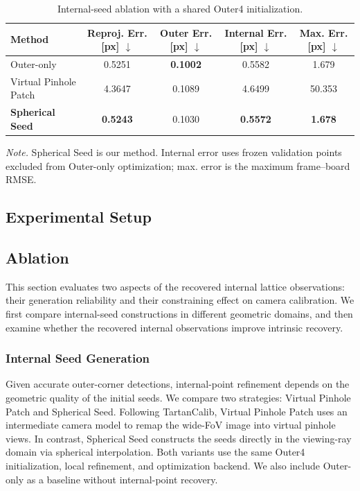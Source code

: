 \documentclass[letterpaper, 10 pt, conference]{ieeeconf}  %
\begin{document}
\begin{table}[t]
\centering
\caption{Internal-seed ablation with a shared Outer4 initialization.}
\label{tab:internal_seed_ablation}
\footnotesize
\setlength{\tabcolsep}{1.5pt}
\renewcommand{\arraystretch}{1.05}
\begin{tabular}{@{}lcccc@{}}
\toprule
Method
& \shortstack{Reproj.\\[-1pt]Err. [px] $\downarrow$}
& \shortstack{Outer\\[-1pt]Err. [px] $\downarrow$}
& \shortstack{Internal\\[-1pt]Err. [px] $\downarrow$}
& \shortstack{Max.\\[-1pt]Err. [px] $\downarrow$} \\
\midrule
Outer-only & 0.5251 & \textbf{0.1002} & 0.5582 & 1.679 \\
Virtual Pinhole Patch & 4.3647 & 0.1089 & 4.6499 & 50.353 \\
\textbf{Spherical Seed} & \textbf{0.5243} & 0.1030 & \textbf{0.5572} & \textbf{1.678} \\
\bottomrule
\end{tabular}
\vspace{2pt}
\parbox{\columnwidth}{\scriptsize \textit{Note.} Spherical Seed is our method. Internal error uses frozen validation points excluded from Outer-only optimization; max. error is the maximum frame--board RMSE.}
\end{table}

\subsection{Experimental Setup}


\subsection{Ablation}
This section evaluates two aspects of the recovered internal lattice
observations: their generation reliability and their constraining effect
on camera calibration. We first compare internal-seed constructions in
different geometric domains, and then examine whether the recovered
internal observations improve intrinsic recovery.

\subsubsection{Internal Seed Generation}

Given accurate outer-corner detections, internal-point refinement
depends on the geometric quality of the initial seeds. We compare two
strategies: Virtual Pinhole Patch and Spherical Seed. Following
TartanCalib, Virtual Pinhole Patch uses an intermediate camera model to
remap the wide-FoV image into virtual pinhole views. In contrast,
Spherical Seed constructs the seeds directly in the viewing-ray domain
via spherical interpolation. Both variants use the same Outer4
initialization, local refinement, and optimization backend. We also
include Outer-only as a baseline without internal-point recovery.
\end{document}
